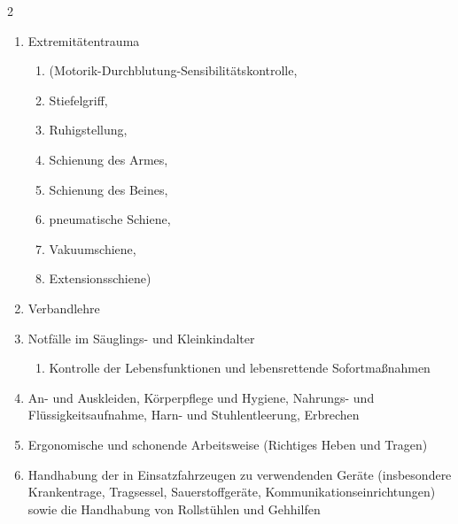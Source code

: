 \begin{WidePar}
\begin{multicols}{2}
\begin{enumerate}
\begin{enumerate}
      \dotfill
    \end{enumerate}
    \item
    Extremitätentrauma
    \begin{enumerate}
      \item
      (Motorik-Durchblutung-Sensibilitätskontrolle,
      \dotfill
      \item      Stiefelgriff,
      \dotfill
      \item      Ruhigstellung,
      \dotfill
      \item      Schienung des Armes,
      \dotfill
      \item      Schienung des Beines,
      \dotfill
      \item      pneumatische Schiene,
      \dotfill
      \item      Vakuumschiene,
      \dotfill
      \item      Extensionsschiene)
      \dotfill
    \end{enumerate}
    \item
    Verbandlehre
    \dotfill
    \item Notfälle im Säuglings- und Kleinkindalter
    \begin{enumerate}
      \item
      Kontrolle der Lebensfunktionen und lebensrettende Sofortmaßnahmen
      \dotfill
    \end{enumerate}
    \item An- und Auskleiden, Körperpflege und Hygiene, Nahrungs- und Flüssigkeitsaufnahme, Harn- und Stuhlentleerung,
    Erbrechen
    \dotfill
    \item Ergonomische und schonende Arbeitsweise (Richtiges Heben und Tragen)
    \dotfill
    \item Handhabung der in Einsatzfahrzeugen zu verwendenden Geräte  (insbesondere
    Krankentrage, Tragsessel,  Sauerstoffgeräte, Kommunikationseinrichtungen) sowie
    die  Handhabung von Rollstühlen und Gehhilfen
    \dotfill
    
  \end{enumerate}


\end{multicols}

\end{WidePar}


